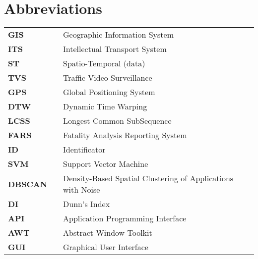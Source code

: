 \section*{Abbreviations}
\label{ch:Abbreviations}

\begin{tabular}{lll}
	\\
	\textbf{GIS}        & & {Geographic Information System} \\[0.5ex]
	\textbf{ITS}        & & {Intellectual Transport System} \\[0.5ex]
	\textbf{ST}         & & {Spatio-Temporal (data)} \\[0.5ex]
	\textbf{TVS}        & & {Traffic Video Surveillance} \\[0.5ex]
	\textbf{GPS}        & & {Global Positioning System} \\[0.5ex]
	\textbf{DTW}        & & {Dynamic Time Warping} \\[0.5ex]
	\textbf{LCSS}       & & {Longest Common SubSequence} \\[0.5ex]
	\textbf{FARS}       & & {Fatality Analysis Reporting System} \\[0.5ex]
	\textbf{ID}			& & {Identificator} \\[0.5ex]
	\textbf{SVM}		& & {Support Vector Machine} \\[0.5ex]
	\textbf{DBSCAN}		& & {Density-Based Spatial Clustering of Applications with Noise} \\[0.5ex]
	\textbf{DI}			& & {Dunn's Index} \\[0.5ex]
	\textbf{API}		& & {Application Programming Interface} \\[0.5ex]	
	\textbf{AWT}		& & {Abstract Window Toolkit} \\[0.5ex]
	\textbf{GUI}		& & {Graphical User Interface} \\[0.5ex]
	
\end{tabular}
